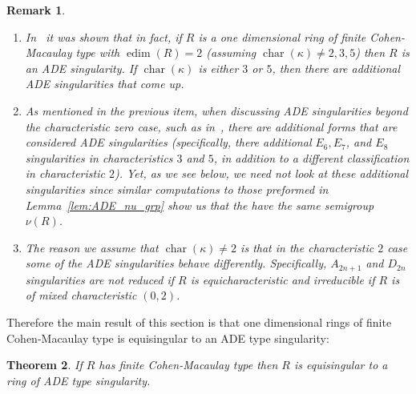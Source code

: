 \documentclass{article}
\newtheorem{theorem}{Theorem}
\newtheorem{notation}[theorem]{Notation}
\newtheorem{remark}[theorem]{Remark}
\DeclareMathOperator{\chara}{char}
\DeclareMathOperator{\edim}{edim}
\numberwithin{theorem}{section}
\begin{document}
\begin{remark}\label{rem:char_nu}
\begin{enumerate}
    \item \textup{In~\cite{svoray2025ade} it was shown that in fact, if $R$ is a one dimensional ring of finite Cohen-Macaulay type with $\edim(R)=2$ (assuming $\chara(\kappa) \neq 2,3,5$) then $R$ is an ADE singularity.  If $\chara(\kappa)$ is either $3$ or $5$, then there are additional ADE singularities that come up. }
    \item \textup{As mentioned in the previous item, when discussing ADE singularities beyond the characteristic zero case, such as in~\cite{svoray2025ade,greuel1988simple}, there are additional forms that are considered ADE singularities (specifically, there additional $E_6, E_7$, and $E_8$ singularities in characteristics $3$ and $5$, in addition to a different classification in characteristic $2$). Yet, as we see below, we need not look at these additional singularities since similar computations to those preformed in Lemma~\ref{lem:ADE_nu_grp} show us that the have the same semigroup $\nu(R)$.   }
    \item \textup{The reason we assume that $\chara(\kappa) \neq 2$ is that in the characteristic $2$ case some of the ADE singularities behave differently. Specifically, $A_{2n+1}$ and $D_{2n}$ singularities are not reduced if $R$ is equicharacteristic and irreducible if $R$ is of mixed characteristic $(0,2)$.}
\end{enumerate}
\end{remark}

Therefore the main result of this section is that one dimensional rings of finite Cohen-Macaulay type is equisingular to an ADE type singularity:

\begin{theorem}\label{thm:ADE_curve}
    If $R$ has finite Cohen-Macaulay type then $R$ is equisingular to a ring of ADE type singularity.
\end{theorem}




    

\end{document}
